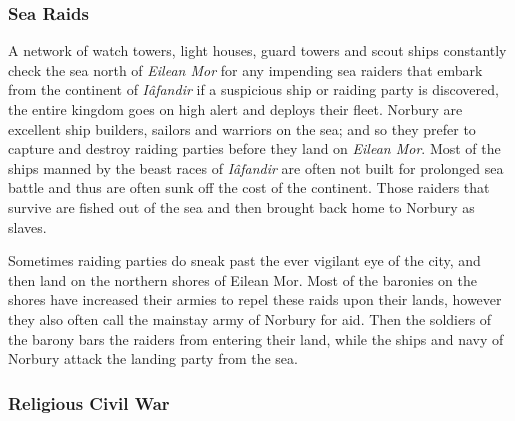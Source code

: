 \subsubsection*{Sea Raids}

A network of watch towers, light houses, guard towers and scout ships
constantly check the sea north of \emph{Eilean Mor} for any impending sea
raiders that embark from the continent of \emph{Iâfandir} if a suspicious
ship or raiding party is discovered, the entire kingdom goes on high alert and
deploys their fleet. Norbury are excellent ship builders, sailors and warriors
on the sea; and so they prefer to capture and destroy raiding parties before
they land on \emph{Eilean Mor}. Most of the ships manned by the beast races of
\emph{Iâfandir} are often not built for prolonged sea battle and thus are
often sunk off the cost of the continent. Those raiders that survive are
fished out of the sea and then brought back home to Norbury as slaves.

Sometimes raiding parties do sneak past the ever vigilant eye of the city,
and then land on the northern shores of Eilean Mor. Most of the baronies
on the shores have increased their armies to repel these raids upon their
lands, however they also often call the mainstay army of Norbury for aid.
Then the soldiers of the barony bars the raiders from entering their land,
while the ships and navy of Norbury attack the landing party from the sea.

\subsubsection*{Religious Civil War}

